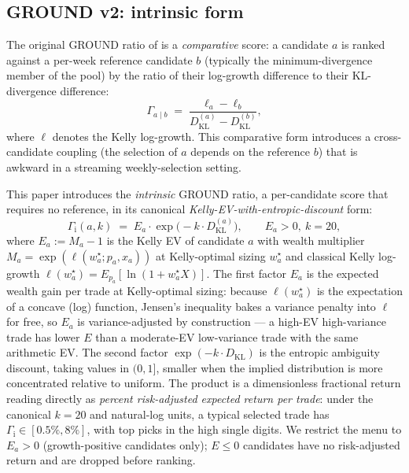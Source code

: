 \documentclass[11pt]{article}
\newcommand{\GROUND}{\Gamma_{\mathrm{i}}}
\begin{document}
\subsection{GROUND v2: intrinsic form}\label{sec:ground-v2}

The original GROUND ratio of \citet{mercurio2020} is a
\emph{comparative} score: a candidate $a$ is ranked against a
per-week reference candidate $b$ (typically the minimum-divergence
member of the pool) by the ratio of their log-growth difference to
their KL-divergence difference:
\begin{equation}
    \Gamma_{a \mid b} \;=\; \frac{\ell_a - \ell_b}{D_{\mathrm{KL}}^{(a)} - D_{\mathrm{KL}}^{(b)}},
    \label{eq:ground-paper}
\end{equation}
where $\ell$ denotes the Kelly log-growth. This comparative form
introduces a cross-candidate coupling (the selection of $a$ depends on
the reference $b$) that is awkward in a streaming weekly-selection
setting.

This paper introduces the \emph{intrinsic} GROUND ratio, a
per-candidate score that requires no reference, in its canonical
\emph{Kelly-EV-with-entropic-discount} form:
\begin{equation}
    \GROUND(a, k) \;=\; E_a \cdot \exp\!\bigl(-k \cdot D_{\mathrm{KL}}^{(a)}\bigr),
    \qquad E_a > 0,\ k = 20,
    \label{eq:ground-canonical}
\end{equation}
where $E_a := M_a - 1$ is the Kelly EV of candidate $a$ with wealth
multiplier $M_a = \exp(\ell(w^\star_a; p_a, x_a))$ at Kelly-optimal
sizing $w^\star_a$ and classical Kelly log-growth $\ell(w^\star_a) =
E_{p_a}[\ln(1 + w^\star_a X)]$. The first factor $E_a$ is the
expected wealth gain per trade at Kelly-optimal sizing: because
$\ell(w^\star_a)$ is the expectation of a concave (log) function,
Jensen's inequality bakes a variance penalty into $\ell$ for free, so
$E_a$ is variance-adjusted by construction --- a high-EV high-variance
trade has lower $E$ than a moderate-EV low-variance trade with the
same arithmetic EV. The second factor $\exp(-k \cdot D_{\mathrm{KL}})$
is the entropic ambiguity discount, taking values in $(0, 1]$, smaller
when the implied distribution is more concentrated relative to uniform.
The product is a dimensionless fractional return reading directly as
\emph{percent risk-adjusted expected return per trade}: under the
canonical $k = 20$ and natural-log units, a typical selected trade has
$\GROUND \in [0.5\%, 8\%]$, with top picks in the high single digits.
We restrict the menu to $E_a > 0$ (growth-positive candidates only);
$E \le 0$ candidates have no risk-adjusted return and are dropped
before ranking.
\end{document}
